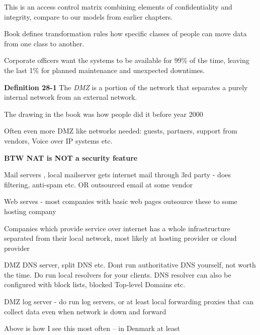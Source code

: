 \documentclass[Screen16to9,17pt]{foils}
\begin{document}
This is an access control matrix combining elements of confidentiality and integrity, compare to our models from earlier chapters.

Book defines transformation rules how specific classes of people can move data from one class to another.

Corporate officers want the systems to be available for 99\% of the time, leaving the last 1\% for planned maintenance and unexpected downtimes.


\begin{list1}
\item {\bf Definition 28-1} The \emph{DMZ} is a portion of the network that separates a purely internal network from an external network.
\item The drawing in the book was how people did it before year 2000 \smiley
\end{list1}




\begin{list1}
\item Often even more DMZ like networks needed: guests, partners, support from vendors, Voice over IP systems etc.
\item {\bf BTW NAT is NOT a security feature}
\end{list1}



\begin{list1}
\item Mail servers , local mailserver gets internet mail through 3rd party - does filtering, anti-spam etc. OR outsourced email at some vendor
\item Web serves - most companies with basic web pages outsource these to some hosting company
\item Companies which provide service over internet has a whole infrastructure separated from their local network, most likely at hosting provider or cloud provider
\item DMZ DNS server, split DNS etc. Dont run authoritative DNS yourself, not worth the time. Do run local resolvers for your clients. DNS resolver can also be configured with block lists, blocked Top-level Domains etc.
\item DMZ log server - do run log servers, or at least local forwarding proxies that can collect data even when network is down and forward
\item Above is how I see this most often -- in Denmark at least
\end{list1}
\end{document}
